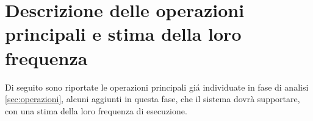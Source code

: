 \documentclass[a4paper,12pt]{report}
\begin{document}
\section{Descrizione delle operazioni principali e stima della loro frequenza}\label{sec:frequenza}
Di seguito sono riportate le operazioni principali giá individuate in fase di
analisi \ref{sec:operazioni}, alcuni aggiunti in questa fase, che il sistema
dovrà supportare, con una stima della loro frequenza di esecuzione.
\end{document}
